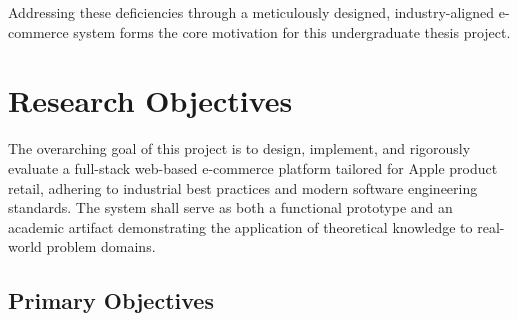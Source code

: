 \documentclass[12pt, a4paper]{report}
\begin{document}
\vspace{0.5cm}
\noindent Addressing these deficiencies through a meticulously designed, industry-aligned e-commerce system forms the core motivation for this undergraduate thesis project.

\section{Research Objectives}

The overarching goal of this project is to design, implement, and rigorously evaluate a full-stack web-based e-commerce platform tailored for Apple product retail, adhering to industrial best practices and modern software engineering standards. The system shall serve as both a functional prototype and an academic artifact demonstrating the application of theoretical knowledge to real-world problem domains.

\subsection{Primary Objectives}
\end{document}
